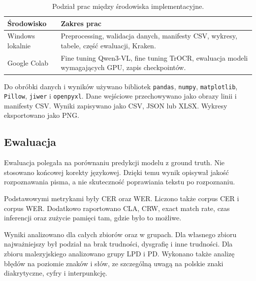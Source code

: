 \begin{table}[H]
    \centering
    \caption{Podział prac między środowiska implementacyjne.}
    \label{tab:srodowiska-implementacyjne}
    \begin{tabularx}{\textwidth}{lX}
        \hline
        Środowisko & Zakres prac \\
        \hline
        Windows lokalnie & Preprocessing, walidacja danych, manifesty CSV, wykresy, tabele, część ewaluacji, Kraken. \\
        Google Colab & Fine tuning Qwen3-VL, fine tuning TrOCR, ewaluacja modeli wymagających GPU, zapis checkpointów. \\
        \hline
    \end{tabularx}
\end{table}

Do obróbki danych i wyników używano bibliotek \texttt{pandas}, \texttt{numpy}, \texttt{matplotlib}, \texttt{Pillow}, \texttt{jiwer} i \texttt{openpyxl}. Dane wejściowe przechowywano jako obrazy linii i manifesty CSV. Wyniki zapisywano jako CSV, JSON lub XLSX. Wykresy eksportowano jako PNG.

\subsection{Ewaluacja}
\label{subsec:ewaluacja-modeli}

Ewaluacja polegała na porównaniu predykcji modelu z ground truth. Nie stosowano końcowej korekty językowej. Dzięki temu wynik opisywał jakość rozpoznawania pisma, a nie skuteczność poprawiania tekstu po rozpoznaniu.

Podstawowymi metrykami były CER oraz WER. Liczono także corpus CER i corpus WER. Dodatkowo raportowano CLA, CRW, exact match rate, czas inferencji oraz zużycie pamięci tam, gdzie było to możliwe.

Wyniki analizowano dla całych zbiorów oraz w grupach. Dla własnego zbioru najważniejszy był podział na brak trudności, dysgrafię i inne trudności. Dla zbioru malezyjskiego analizowano grupy LPD i PD. Wykonano także analizę błędów na poziomie znaków i słów, ze szczególną uwagą na polskie znaki diakrytyczne, cyfry i interpunkcję.

\FloatBarrier
